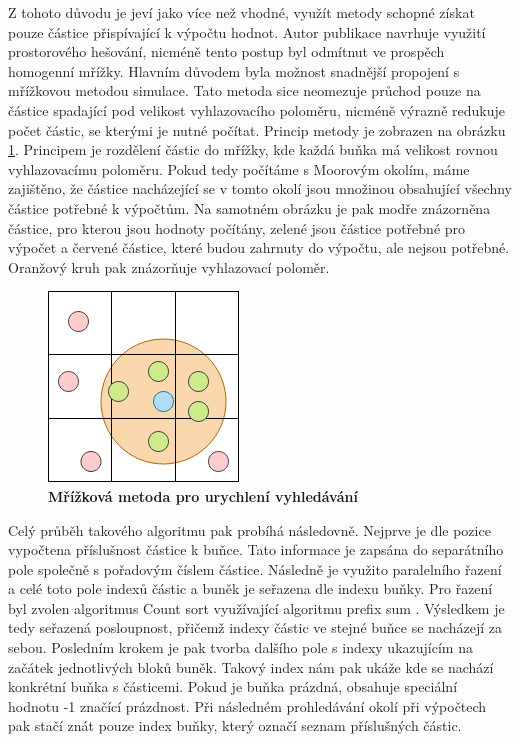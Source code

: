 Z tohoto důvodu je jeví jako více než vhodné, využít metody schopné získat pouze částice přispívající k výpočtu hodnot. Autor publikace \cite{KelagerSPH} navrhuje využití prostorového hešování, nicméně tento postup byl odmítnut ve prospěch homogenní mřížky. Hlavním důvodem byla možnost snadnější propojení s mřížkovou metodou simulace. Tato metoda sice neomezuje průchod pouze na částice spadající pod velikost vyhlazovacího poloměru, nicméně výrazně redukuje počet částic, se kterými je nutné počítat. Princip metody je zobrazen na obrázku \ref{fig:GridSPH}. Principem je rozdělení částic do mřížky, kde každá buňka má velikost rovnou vyhlazovacímu poloměru. Pokud tedy počítáme s Moorovým okolím, máme zajištěno, že částice nacházející se v tomto okolí jsou množinou obsahující všechny částice potřebné k výpočtům. Na samotném obrázku je pak modře znázorněna částice, pro kterou jsou hodnoty počítány, zelené jsou částice potřebné pro výpočet a červené částice, které budou zahrnuty do výpočtu, ale nejsou potřebné. Oranžový kruh pak znázorňuje vyhlazovací poloměr.

\begin{figure}[hbt]
	\centering
	\captionsetup{justification=centering}
	\includegraphics[scale=0.6]{obrazky-figures/GridSPH.png}
	\caption{\textbf{Mřížková metoda pro urychlení vyhledávání}}
	\label{fig:GridSPH}
\end{figure}

Celý průběh takového algoritmu pak probíhá následovně. Nejprve je dle pozice vypočtena příslušnost částice k buňce. Tato informace je zapsána do separátního pole společně s pořadovým číslem částice. Následně je využito paralelního řazení a celé toto pole indexů částic a buněk je seřazena dle indexu buňky. Pro řazení byl zvolen algoritmus Count sort \cite{CountSortGPU} využívající algoritmu prefix sum \cite{GPUGemsPrefixSum}.  Výsledkem je tedy seřazená posloupnost, přičemž indexy částic ve stejné buňce se nacházejí za sebou. Posledním krokem je pak tvorba dalšího pole s indexy ukazujícím na začátek jednotlivých bloků buněk. Takový index nám pak ukáže kde se nachází konkrétní buňka s částicemi. Pokud je buňka prázdná, obsahuje speciální hodnotu -1 značící prázdnost. Při následném prohledávání okolí při výpočtech pak stačí znát pouze index buňky, který označí seznam příslušných částic.

